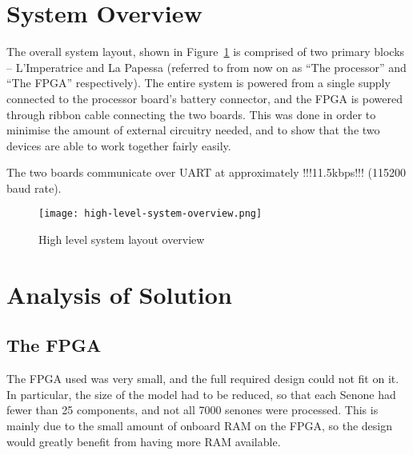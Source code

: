 \section{System Overview} %
\label{sec:system_overview}
	The overall system layout, shown in Figure~\ref{fig:hlsystem} is comprised of two primary blocks -- L'Imperatrice and La Papessa (referred to from now on as ``The processor'' and ``The FPGA'' respectively). The entire system is powered from a single supply connected to the processor board's battery connector, and the FPGA is powered through ribbon cable connecting the two boards.  This was done in order to minimise the amount of external circuitry needed, and to show that the two devices are able to work together fairly easily.

	The two boards communicate over UART at approximately !!!11.5kbps!!! (115200 baud rate).



	\begin{figure}[tb]
		\begin{center}
			\texttt{[image: high-level-system-overview.png]}
		\end{center}
		\caption{High level system layout overview}
		\label{fig:hlsystem}
	\end{figure}


\section{Analysis of Solution} %
\label{sec:analysis_of_solution}

	\subsection{The FPGA} %
	\label{sub:the_fpga}
		The FPGA used was very small, and the full required design could not fit on it.  In particular, the size of the model had to be reduced, so that each Senone had fewer than 25 components, and not all 7000 senones were processed.  This is mainly due to the small amount of onboard RAM on the FPGA, so the design would greatly benefit from having more RAM available.

